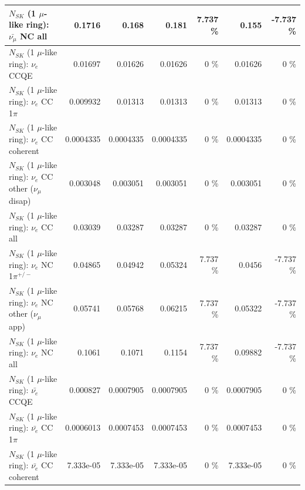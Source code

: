 \begin{table}
\begin{tabular}{| l | r | r | r  r | r  r |}
                          $N_{SK}$ (1 $\mu$-like ring): $\bar{\nu_{\mu}}$ NC all &          0.1716 &           0.168 &           0.181 &    7.737 \%  &           0.155 &   -7.737 \%  \\ 
\hline
\hline
\hline
                                      $N_{SK}$ (1 $\mu$-like ring): $\nu_e$ CCQE &         0.01697 &         0.01626 &         0.01626 &        0 \%  &         0.01626 &        0 \%  \\ 
                                 $N_{SK}$ (1 $\mu$-like ring): $\nu_e$ CC 1$\pi$ &        0.009932 &         0.01313 &         0.01313 &        0 \%  &         0.01313 &        0 \%  \\ 
                               $N_{SK}$ (1 $\mu$-like ring): $\nu_e$ CC coherent &       0.0004335 &       0.0004335 &       0.0004335 &        0 \%  &       0.0004335 &        0 \%  \\ 
                $N_{SK}$ (1 $\mu$-like ring): $\nu_e$ CC other ($\nu_\mu$ disap) &        0.003048 &        0.003051 &        0.003051 &        0 \%  &        0.003051 &        0 \%  \\ 
                                  $N_{SK}$ (1 $\mu$-like ring): $\nu_{e}$ CC all &         0.03039 &         0.03287 &         0.03287 &        0 \%  &         0.03287 &        0 \%  \\ 
\hline
                           $N_{SK}$ (1 $\mu$-like ring): $\nu_e$ NC 1$\pi^{+/-}$ &         0.04865 &         0.04942 &         0.05324 &    7.737 \%  &          0.0456 &   -7.737 \%  \\ 
                  $N_{SK}$ (1 $\mu$-like ring): $\nu_e$ NC other ($\nu_\mu$ app) &         0.05741 &         0.05768 &         0.06215 &    7.737 \%  &         0.05322 &   -7.737 \%  \\ 
                                  $N_{SK}$ (1 $\mu$-like ring): $\nu_{e}$ NC all &          0.1061 &          0.1071 &          0.1154 &    7.737 \%  &         0.09882 &   -7.737 \%  \\ 
\hline
\hline
\hline
                                $N_{SK}$ (1 $\mu$-like ring): $\bar{\nu_e}$ CCQE &        0.000827 &       0.0007905 &       0.0007905 &        0 \%  &       0.0007905 &        0 \%  \\ 
                           $N_{SK}$ (1 $\mu$-like ring): $\bar{\nu_e}$ CC 1$\pi$ &       0.0006013 &       0.0007453 &       0.0007453 &        0 \%  &       0.0007453 &        0 \%  \\ 
                         $N_{SK}$ (1 $\mu$-like ring): $\bar{\nu_e}$ CC coherent &       7.333e-05 &       7.333e-05 &       7.333e-05 &        0 \%  &       7.333e-05 &        0 \%  \\ 

\end{tabular}
\end{table}
